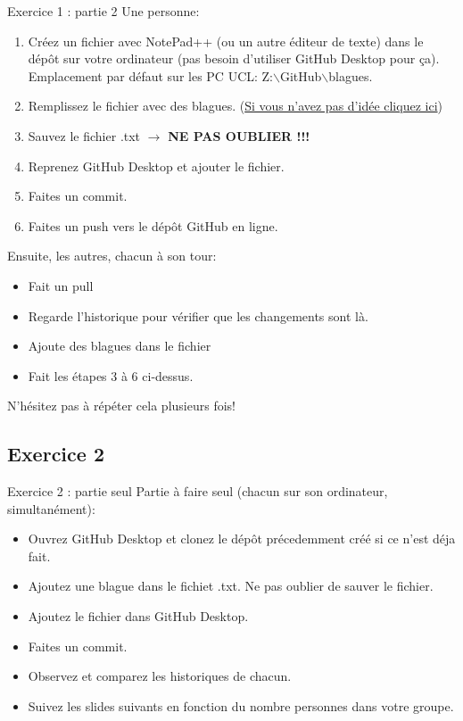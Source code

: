 \documentclass{beamer}
\begin{document}
\begin{frame}{Exercice 1 : partie 2}
    Une personne:
    \begin{enumerate}
        \item Créez un fichier avec NotePad++ (ou un autre éditeur de texte)
            dans le dépôt sur votre ordinateur (pas besoin d'utiliser
            GitHub Desktop pour ça). Emplacement par défaut sur les PC UCL:
            Z:$\backslash$GitHub$\backslash$blagues.
        \item Remplissez le fichier avec des blagues.
            (\href{https://linuxfr.org/news/blagues-d-informaticiens}{Si vous
            n'avez pas d'idée cliquez ici})
        \item Sauvez le fichier .txt $\rightarrow$ \textbf{NE PAS OUBLIER !!!}
        \item Reprenez GitHub Desktop et ajouter le fichier.
        \item Faites un commit.
        \item Faites un push vers le dépôt GitHub en ligne.
    \end{enumerate}
    Ensuite, les autres, chacun à son tour:
    \begin{itemize}
        \item Fait un pull
        \item Regarde l'historique pour vérifier que les changements sont là.
        \item Ajoute des blagues dans le fichier
        \item Fait les étapes 3 à 6 ci-dessus.
    \end{itemize}
    N'hésitez pas à répéter cela plusieurs fois!
\end{frame}

\subsection{Exercice 2}
\begin{frame}{Exercice 2 : partie seul}
    Partie à faire seul (chacun sur son ordinateur, simultanément):
    \begin{itemize}
        \item Ouvrez GitHub Desktop et clonez le dépôt précedemment créé
            si ce n'est déja fait.
        \item Ajoutez une blague dans le fichiet .txt. Ne pas oublier de sauver
            le fichier.
        \item Ajoutez le fichier dans GitHub Desktop.
        \item Faites un commit.
        \item Observez et comparez les historiques de chacun.
        \item Suivez les slides suivants en fonction du nombre personnes dans
            votre groupe.
    \end{itemize}
\end{frame}
\end{document}
